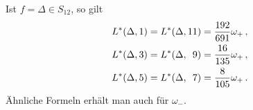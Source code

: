 \begin{bsp}
	Ist $f = \Delta \in S_{12}$, so gilt
	\begin{align*}
		L^*(\Delta, 1) &= L^*(\Delta, 11) = \frac{192}{691} \omega_+ \,, \\
		L^*(\Delta, 3) &= L^*(\Delta, \phantom{11}\makebox[0pt][r]{9}) = \frac{16}{135} \omega_+ \,, \\
		L^*(\Delta, 5) &= L^*(\Delta, \phantom{11}\makebox[0pt][r]{7}) = \frac{8}{105} \omega_+ \,.
	\end{align*}
	Ähnliche Formeln erhält man auch für $\omega_-$.
\end{bsp}